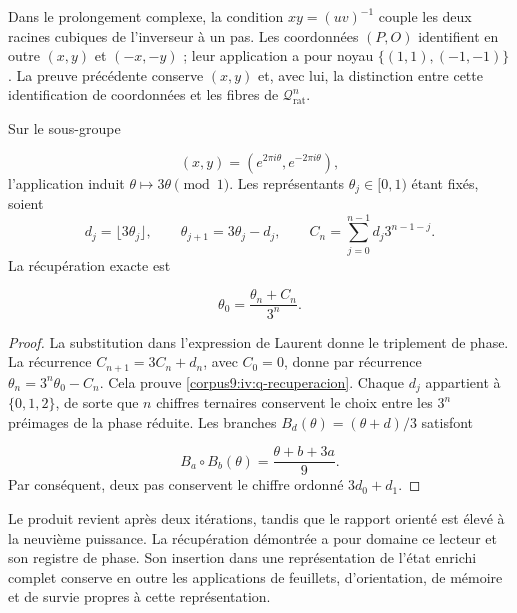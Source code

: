 Dans le prolongement complexe, la condition \(xy=(uv)^{-1}\)
couple les deux racines cubiques de l’inverseur à un pas. Les
coordonnées \((P,O)\) identifient en outre
\((x,y)\) et \((-x,-y)\) ; leur application a pour noyau
\(\{(1,1),(-1,-1)\}\). La preuve précédente conserve \((x,y)\)
et, avec lui, la distinction entre cette identification de coordonnées
et les fibres de \(\mathcal Q_{\mathrm{rat}}^n\).

\begin{proposition}
\label{corpus9:iv:q-acarreo}
Sur le sous-groupe

\[
 (x,y)=(e^{2\pi i\theta},e^{-2\pi i\theta}),
\]
l’application induit \(\theta\mapsto3\theta\pmod1\).
Les représentants \(\theta_j\in[0,1)\) étant fixés, soient
\[
 d_j=\lfloor3\theta_j\rfloor,\qquad
 \theta_{j+1}=3\theta_j-d_j,\qquad
 C_n=\sum_{j=0}^{n-1}d_j3^{n-1-j}.
\]
La récupération exacte est

\begin{equation}
 \theta_0=\frac{\theta_n+C_n}{3^n}.
 \label{corpus9:iv:q-recuperacion}
\end{equation}
\end{proposition}
\begin{proof}
La substitution dans l’expression de Laurent donne le triplement de
phase. La récurrence \(C_{n+1}=3C_n+d_n\), avec \(C_0=0\),
donne par récurrence \(\theta_n=3^n\theta_0-C_n\). Cela prouve
\eqref{corpus9:iv:q-recuperacion}. Chaque \(d_j\) appartient à
\(\{0,1,2\}\), de sorte que \(n\) chiffres ternaires conservent
le choix entre les \(3^n\) préimages de la phase réduite.
Les branches \(B_d(\theta)=(\theta+d)/3\) satisfont

\[
 B_a\circ B_b(\theta)=\frac{\theta+b+3a}{9}.
\]
Par conséquent, deux pas conservent le chiffre ordonné \(3d_0+d_1\).
\end{proof}

Le produit revient après deux itérations, tandis que le rapport
orienté est élevé à la neuvième puissance. La récupération démontrée
a pour domaine ce lecteur et son registre de phase. Son insertion
dans une représentation de l’état enrichi complet conserve
en outre les applications de feuillets, d’orientation, de mémoire et de
survie propres à cette représentation.
